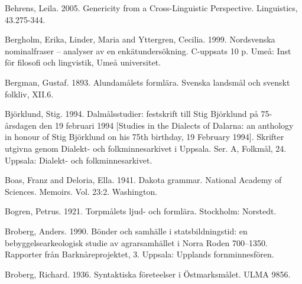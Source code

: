 \begin{styleBodytextC}
Behrens, Leila. 2005. Genericity from a Cross-Linguistic Perspective. Linguistics, 43.275-344.

\end{styleBodytextC}

\begin{styleBodytextC}
Bergholm, Erika, Linder, Maria and Yttergren, Cecilia. 1999. Nordsvenska nominalfraser – analyser av en enkätundersökning. C-uppsats 10 p. Umeå: Inst för filosofi och lingvistik, Umeå universitet.

\end{styleBodytextC}

\begin{styleBodytextC}
Bergman, Gustaf. 1893. Alundamålets formlära. Svenska landsmål och svenskt folkliv, XII.6.

\end{styleBodytextC}

\begin{styleBodytextC}
Björklund, Stig. 1994. Dalmålsstudier: festskrift till Stig Björklund på 75-årsdagen den 19 februari 1994 [Studies in the Dialects of Dalarna: an anthology in honour of Stig Björklund on his 75th birthday, 19 February 1994]. Skrifter utgivna genom Dialekt- och folkminnesarkivet i Uppsala. Ser. A, Folkmål, 24. Uppsala: Dialekt- och folkminnesarkivet.

\end{styleBodytextC}

\begin{styleBodytextC}
Boas, Franz and Deloria, Ella. 1941. Dakota grammar. National Academy of Sciences. Memoirs. Vol. 23:2. Washington.

\end{styleBodytextC}

\begin{styleBodytextC}
Bogren, Petrus. 1921. Torpmålets ljud- och formlära. Stockholm: Norstedt.

\end{styleBodytextC}

\begin{styleBodytextC}
Broberg, Anders. 1990. Bönder och samhälle i statsbildningstid: en bebyggelsearkeologisk studie av agrarsamhället i Norra Roden 700–1350. Rapporter från Barknåreprojektet, 3. Uppsala: Upplands fornminnesfören.

\end{styleBodytextC}

\begin{styleBodytextC}
Broberg, Richard. 1936. Syntaktiska företeelser i Östmarksmålet. ULMA 9856.

\end{styleBodytextC}

